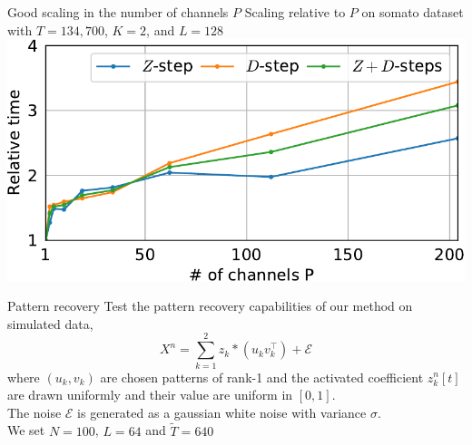 \documentclass{beamer}
\def\tT{\widetilde{T}}
\begin{document}



\begin{frame}{Good scaling in the number of channels $P$}
    Scaling relative to $P$ on somato dataset with $T=134,700$, $K=2$, and $L=128$\\[1em]
    \includegraphics[width=\textwidth]{scaling_channels_reg0_001_mean_rank1_K2_L128.pdf}
\end{frame}

\begin{frame}{Pattern recovery}
Test the pattern recovery capabilities of our method on simulated data,
\[
	X^n = \sum_{k=1}^2 z_k * (u_kv_k^\top) + \mathcal E
\]
where $(u_k, v_k)$ are chosen patterns of rank-1 and the activated coefficient $z^n_k[t]$ are drawn uniformly and their value are uniform in $[0, 1]$.\\[1em]
The noise $\mathcal E$ is generated as a gaussian white noise with variance $\sigma$.\\[1em]

We set $N=100$, $L=64$ and $\tT=640$
\end{frame}
\end{document}
